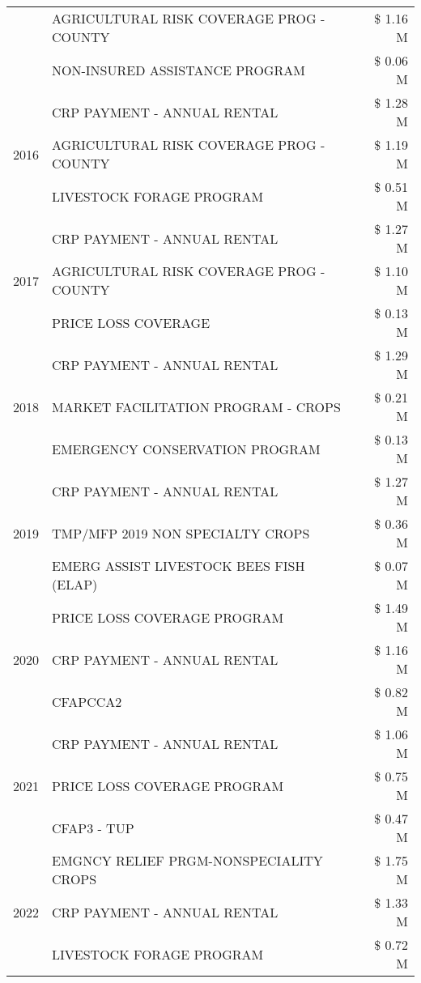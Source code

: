 \begin{tabular}{llr}
 & AGRICULTURAL RISK COVERAGE PROG - COUNTY & \$ 1.16 M \\
 & NON-INSURED ASSISTANCE PROGRAM & \$ 0.06 M \\
\cline{1-3}
\multirow[t]{3}{*}{2016} & CRP PAYMENT - ANNUAL RENTAL & \$ 1.28 M \\
 & AGRICULTURAL RISK COVERAGE PROG - COUNTY & \$ 1.19 M \\
 & LIVESTOCK FORAGE PROGRAM & \$ 0.51 M \\
\cline{1-3}
\multirow[t]{3}{*}{2017} & CRP PAYMENT - ANNUAL RENTAL & \$ 1.27 M \\
 & AGRICULTURAL RISK COVERAGE PROG - COUNTY & \$ 1.10 M \\
 & PRICE LOSS COVERAGE & \$ 0.13 M \\
\cline{1-3}
\multirow[t]{3}{*}{2018} & CRP PAYMENT - ANNUAL RENTAL & \$ 1.29 M \\
 & MARKET FACILITATION PROGRAM - CROPS & \$ 0.21 M \\
 & EMERGENCY CONSERVATION PROGRAM & \$ 0.13 M \\
\cline{1-3}
\multirow[t]{3}{*}{2019} & CRP PAYMENT - ANNUAL RENTAL & \$ 1.27 M \\
 & TMP/MFP 2019 NON SPECIALTY CROPS & \$ 0.36 M \\
 & EMERG ASSIST LIVESTOCK BEES FISH (ELAP) & \$ 0.07 M \\
\cline{1-3}
\multirow[t]{3}{*}{2020} & PRICE LOSS COVERAGE PROGRAM & \$ 1.49 M \\
 & CRP PAYMENT - ANNUAL RENTAL & \$ 1.16 M \\
 & CFAPCCA2 & \$ 0.82 M \\
\cline{1-3}
\multirow[t]{3}{*}{2021} & CRP PAYMENT - ANNUAL RENTAL & \$ 1.06 M \\
 & PRICE LOSS COVERAGE PROGRAM & \$ 0.75 M \\
 & CFAP3 - TUP & \$ 0.47 M \\
\cline{1-3}
\multirow[t]{3}{*}{2022} & EMGNCY RELIEF PRGM-NONSPECIALITY CROPS & \$ 1.75 M \\
 & CRP PAYMENT - ANNUAL RENTAL & \$ 1.33 M \\
 & LIVESTOCK FORAGE PROGRAM & \$ 0.72 M \\
\cline{1-3}
\bottomrule
\end{tabular}

